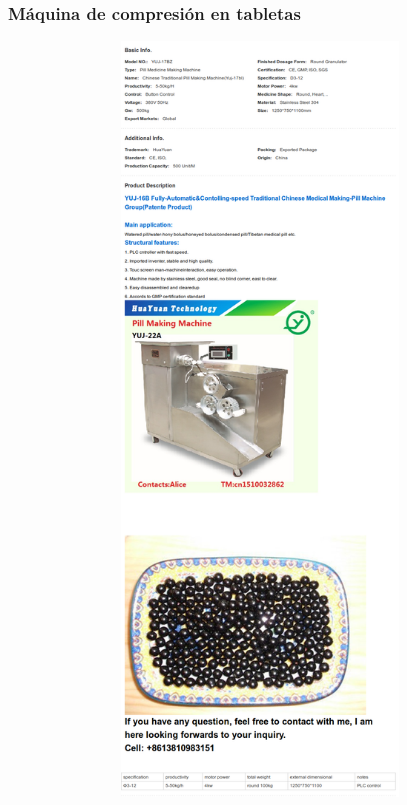 \subsubsection{Máquina de compresión en tabletas}
\includegraphics[width=15cm,height=20cm,keepaspectratio]{Datasheets/2MaquinaPrensado.png} 
\newpage

